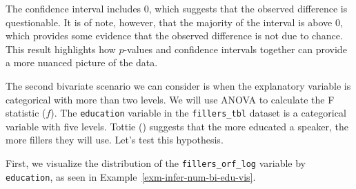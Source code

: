 \documentclass[
  letterpaper,
  krantz1]{latex/krantz-mod}
\theoremstyle{definition}
\theoremstyle{definition}
\theoremstyle{remark}
\begin{document}
The confidence interval includes 0, which suggests that the observed
difference is questionable. It is of note, however, that the majority of
the interval is above 0, which provides some evidence that the observed
difference is not due to chance. This result highlights how
\(p\)-values and confidence
intervals together can provide a more nuanced
picture of the data.

The second bivariate scenario we can consider is when the explanatory
variable is categorical with more than two
levels. We will use ANOVA to
calculate the F statistic (\(f\)). The \texttt{education} variable in
the \texttt{fillers\_tbl} dataset is a categorical variable with five
levels. Tottie () suggests that the more
educated a speaker, the more fillers they will use. Let's test this
hypothesis.

First, we visualize the distribution of the \texttt{fillers\_orf\_log}
variable by \texttt{education}, as seen in
Example~\ref{exm-infer-num-bi-edu-vis}.
\end{document}
